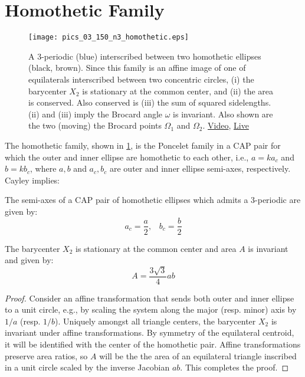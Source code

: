 \section{Homothetic Family}
 
\begin{figure}
    \centering
    \texttt{[image: pics\_03\_150\_n3\_homothetic.eps]}
    \caption{A 3-periodic (blue) interscribed between two homothetic ellipses (black, brown). Since this family is an affine image of one of equilaterals interscribed between two concentric circles, (i) the barycenter $X_2$ is stationary at the common center, and (ii) the area is conserved. Also conserved is (iii) the sum of squared sidelengths. (ii) and (iii) imply the Brocard angle $\omega$ is invariant. Also shown are the two (moving) the Brocard points $\Omega_1$ and $\Omega_2$. \href{https://youtu.be/2fvGd8wioZY}{Video}, \href{https://bit.ly/3aYnrVM}{Live}}
    \label{fig:03-homoth-brocard}
\end{figure}

The homothetic family, shown in \cref{fig:03-homoth-brocard}, is the Poncelet family in a CAP pair for which the outer and inner ellipse are homothetic to each other, i.e., $a = k a_c$ and $b = k b_c$, where $a,b$ and $a_c,b_c$ are outer and inner ellipse semi-axes, respectively. Cayley implies:

\begin{proposition}
The semi-axes of a CAP pair of homothetic ellipses which admits a 3-periodic are given by:
\[ a_c = \frac{a}{2},\;\;\;b_c=\frac{b}{2} \]
\label{prop:03-homothetic-cayley}
\end{proposition}

\begin{proposition}
The barycenter $X_2$ is stationary at the common center and area $A$ is invariant and given by:
\[A= \frac{3\sqrt{3}}{4} a b \]
\end{proposition}

\begin{proof}
Consider an affine transformation that sends both outer and inner ellipse to a unit circle, e.g., by scaling the system along the major (resp. minor) axis by $1/a$ (resp. $1/b$). Uniquely amongst all triangle centers, the barycenter $X_2$ is invariant under affine transformations. By symmetry of the equilateral centroid, it will be identified with the center of the homothetic pair. Affine transformations preserve area ratios, so $A$ will be the the area of an equilateral triangle inscribed in a unit circle scaled by the inverse Jacobian $a b$. This completes the proof.
\end{proof}

